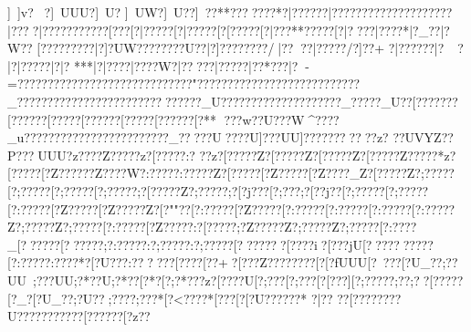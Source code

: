 {{{{{{{{{{{{{{{{{{{{{{{{{{{{{{{{{{{{{{{{{{{{{{{{{{{{{{{{{{{{{{{{{{{{{{{{{{{{{{{{{{{{{{{{{{{{{{{{{{{{{{{{{{{{{{{{{{{{{{{{{{{{{{{{{{{{{{{{{{{{{{{{{{{{{{{{{{{{{{{{{{{{{{{{{{{{{{{{{{{{{{{{{{{{{{{{{{{{{{{{{{{{{{{{{{{{{{{{{{{{{{{{{{{{{{{{{{{{{{{{{{{{{{{{{{{{{{{{{{{{{{{{{{{{{{{{{{{{{{{{{{{{{{{{{{{{{{{{{{{{{{{{{{{{{{{{{{{{{{{{{{{{{{{{{{{{{{{{{{{{{{{{{{{{{{{{{{{{{{{{{{{{{{{{{{{{{{{{{{{{{{{{{{{{{{{{{{{{{{{{{{{{{{{{{{{{{{{{{{{{{{{{{{{{{{{{{{{{{{{{{{{{{{{{{{{{{{{{{{{{{{{{{{{{{{{{{{{{{{{{{{{{{{{{{{{{{{{{{{{{{{{{{{{{{{{{{{{{{{{{{{{{{{{{{{{{{{{{{{{{{{{{{{{{{{{{{{{{{{{{{{{{{{{{{{{{{{{{{{{{{{{{{{{{{{{{{{{{{{{{{{{{{{{{{{{{{{{{{{{{{{{{{{{{{{{{{{{{{{{{{{{{{{{{{{{{{{{{{{{{{{{{{{{{{{{{{{{{{{{{{{{{{{{{{{{{{{{{{{{{{{{{{{{{{{{{{{{{{{{{{{{{{{{{{{{{{{{{{{{{{{{{{{{{{{{{{{{{{{{{{{{{{{{{{{{{{{{{{{{{{{{{{{{{{{{{{{{{{{{{{{{{{{{{{{{{{{{{{{{{{{{{{{{{{{{{{{{{{{{{{{{{{{{{{{{{{{{{{{{{{{{{{{{{{{{{{{{{{{{{{{{{{{{{{{{{{{{{{{{{{{{{{{{{{{{{{{{{{{{{{{{{{{{{{{{{{{{{{{{{{{{{{{{{{{{{{{{{{{{{{{{{{{{{{{{{{{{{{{{{{{{{{{{{{{{{{{{{{{{{{{{{{{{{{{{{{{{{{{{{{{{{{{{{{{{{{{{{{{{{{{{{{{{{{{{{{{{{{{{{{{{{{{{{{{{{{{{{{{{{{{{{{{{{{{{{{{{{{{{{{{{{{{{{{{{{{{{{{{{{{{{{{{{{{{{{{{{{{{{{{{{{{{{{{{{{{{{{{{{{{{{{{{{{{{{{{{{{{{{{{{{{{{{{{{{{{{{{{{{{{{{{{{{{{{{{{{{{{{{{{{{{{{{{{{{{{{{{{{{{{{{{{{{{{{{{{{{{{{{{{{{{{{{{{{{{{{{{{{{{{{{{{{{{{{{{{{{{{{{{{{{{{{{{{{{{{{{{{{{{{{{{{{{{{{{{{{{{{{{{{{{{{{{{{{{{{{{{{{{{{{{{{{{{{{{{{{{{{{{{{{{{{{{{{{{{{{{{{{{{{{{{{{{{{{{{{{{{{{{{{{{{{{{{{]~]v? ?]~UUU?\?]~U?
\?]~UW? \?]~U?? \?]~??**\?\????{?\????*{?|?????{?|?????{???????{???????{?|??? {?|?????{?\?????{?[???[?|?????[?|?????[?[?????[?|???**{?\?????[?|????|?\????*|?\?_??|?\?W??
[?}????\?}???? |?]?UW? \?}?????}?}?U??|?]?????\?}???/|?}???|?}????/{?]??+
{?|?????{?|?~?|?|?????|?|?
***|?|????|?}???W?|?}????|?}? ???|?}?  *???|?-=?????????????????????????????"? ??????????????????????????_??????????????????????????????_U??{???????{???????{????_??{???_U??[???????[?????{?[? ???{?[?????{?[????{?[?????{?[?**
??{?w??U??{?W^???{?_u????{?????{???????{???????{?_????{?U? ??{?U]??{?UU]?{?{???  {?{?   {?{?  ?{?z?    {?{?UVYZ{?{?P   ??{?UUU{?z?  ??{?Z?????z?[????{?:?  ??z?[?????Z?[?????Z?[?????Z?[?????Z?{????*z?[?????[?Z?????{?Z????W{?:????{?:?????Z?[?????[?Z?????[?Z????_Z?[?????Z?;?????[?;?????[?;?????[?;?????;?[?????Z?;?????;?[?j???[?;???;?[??j??[?;?????[?;?????[?:?????[?Z?????[?Z?????Z?[?""??[?:?????[?Z?????[?:?????[?:?????[?:?????[?:?????Z?;?????Z?;?????[?:?????[?Z?????:?[?????;?Z?????Z?;?????Z?;?????[?:????_[??????[??????;?:?????:?;?????:?;?????[???????[????i?[???jU[????  {??????[?:???? {?:????*{?[?U?? {?:??  {???   {?[??? {?[??+ {?[??   {?Z?????{?{??   [?[?fUUU[?\?~???[?\?U_??;?\??UU~;?\???UU;?\?*??U;?\? *??[?\?  *?[?;?*???z?[????U[?;?  ??[?;?  ??[?[???][?;?????;?\??   ;?\??  [?\?????[?\?_? [?\?U_??;?\?U??;?\???? ;?\???* [?<????*[?\???  [?[?U???{?\???*
{?|??
  ??[???????{?U?????{?????{?[?????{?[?z??\?{??UUU{?|?~???{?\?W~??[?\?W??\?]?W_??]?]~????]?]~??? ]?<?  ?X;?]?U???;?]?U?? ;?]?U_z?]~]???iU\?]?UU?\?]???? \?]?UU?*\?]?UUWz=?}~????]?<???? ]?<?????]?<?????<?]~????<?<????<?]~ ???]??U<?]~ ???<?]~ ????]??????<???U?;?<?????;?<?W^??<?<?????;?<??/+
;?<?????;?<?????;?;?UW??;?<???*;?<?????;?<?????\?;??UU?;?;?????;?;?W???;?<???;?=???? ;?<???~z;?<?W?U<?]~~??<?]~UU_?]?]~UUU~?]~??UU=?]~z???\?]~UU??<?]~UU_?]~=v? ]~]v   ]~]v??  ]~]v }}}}}}}}}}}}}}}}}}}}}}}}}}}}}}}}}}}}}}}}}}}}}}}}}}}}}}}}}}}}}}}}}}}}}}}}}}}}}}}}}}}}}}}}}}}}}}}}}}}}}}}}}}}}}}}}}}}}}}}}}}}}}}}}}}}}}}}}}}}}}}}}}}}}}}}}}}}}}}}}}}}}}}}}}}}}}}}}}}}}}}}}}}}}}}}}}}}}}}}}}}}}}}}}}}}}}}}}}}}}}}}}}}}}}}}}}}}}}}}}}}}}}}}}}}}}}}}}}}}}}}}}}}}}}}}}}}}}}}}}}}}}}}}}}}}}}}}}}}}}}}}}}}}}}}}}}}}}}}}}}}}}}}}}}}}}}}}}}}}}}}}}}}}}}}}}}}}}}}}}}}}}}}}}}}}}}}}}}}}}}}}}}}}}}}}}}}}}}}}}}}}}}}}}}}}}}}}}}}}}}}}}}}}}}}}}}}}}}}}}}}}}}}}}}}}}}}}}}}}}}}}}}}}}}}}}}}}}}}}}}}}}}}}}}}}}}}}}}}}}}}}}}}}}}}}}}}}}}}}}}}}}}}}}}}}}}}}}}}}}}}}}}}}}}}}}}}}}}}}}}}}}}}}}}}}}}}}}}}}}}}}}}}}}}}}}}}}}}}}}}}}}}}}}}}}}}}}}}}}}}}}}}}}}}}}}}}}}}}}}}}}}}}}}}}}}}}}}}}}}}}}}}}}}}}}}}}}}}}}}}}}}}}}}}}}}}}}}}}}}}}}}}}}}}}}}}}}}}}}}}}}}}}}}}}}}}}}}}}}}}}}}}}}}}}}}}}}}}}}}}}}}}}}}}}}}}}}}}}}}}}}}}}}}}}}}}}}}}}}}}}}}}}}}}}}}}}}}}}}}}}}}}}}}}}}}}}}}}}}}}}}}}}}}}}}}}}}}}}}}}}}}}}}}}}}}}}}}}}}}}}}}}}}}}}}}}}}}}}}}}}}}}}}}}}}}}}}}}}}}}}}}}}}}}}}}}}}}}}}}}}}}}}}}}}}}}}}}}}}}}}}}}}}}}}}}}}}}}}}}}}}}}}}}}}}}}}}}}}}}}}}}}}}}}}}}}}}}}}}}}}}}}}}}}}}}}}}}}}}}}}}}}}}}}}}}}}}}}}}}}}}}}}}}}}}}}}}}}}}}}}}}}}}}}}}}}}}}}}}}}}}}}}}}}}}}}}}}}}}}}}}}}}}}}}}}}}}}}}}}}}}}}}}}}}}}}}}}}}}}}}}}}}}}}}}}}}}}}}}}}}}}}}}}}}}}}}}}}}}}}}}}}}}}}}}}}}}}}}}}}}}}}}}}}}}}}}}}}}}}}}}}}}}}}}}}}}}}}}}}}}}}}}}}}}}}}}}}}}}}}}}}}}}}}}}}}}}}}}}}}}}}}}}}}}}}}}}}}}}}}}}}}}}}}}}}}}}}}}}}}}}}}}}}}}}}}}}}}}}}}}}}}}}}}}}}}}}}}}}}}}}}}}}}}}}}}}}}}}}}}}}}}}}}}}}}}}}}}}}}}}}}}}}}}}}}}}}}}}}}}}}}}}}}}}}}}}}}}}}}}}}}}}}}}}}}}}}}}}}}}}}}}}}
